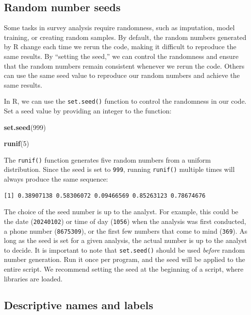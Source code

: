 \documentclass[
]{krantz}
\makeatletter
\newenvironment{Shaded}{\begin{snugshade}}{\end{snugshade}}
\newcommand{\DecValTok}[1]{\textcolor[rgb]{0.06,0.06,0.06}{#1}}
\newcommand{\FunctionTok}[1]{\textcolor[rgb]{0.27,0.27,0.27}{\textbf{#1}}}
\newcommand{\NormalTok}[1]{#1}
\newenvironment{kframe}{%
\medskip{}
\setlength{\fboxsep}{.8em}
 \def\at@end@of@kframe{}%
 \ifinner\ifhmode%
  \def\at@end@of@kframe{\end{minipage}}%
  \begin{minipage}{\columnwidth}%
 \fi\fi%
 \def\FrameCommand##1{\hskip\@totalleftmargin \hskip-\fboxsep
 \colorbox{shadecolor}{##1}\hskip-\fboxsep
     \hskip-\linewidth \hskip-\@totalleftmargin \hskip\columnwidth}%
 \MakeFramed {\advance\hsize-\width
   \@totalleftmargin\z@ \linewidth\hsize
   \@setminipage}}%
 {\par\unskip\endMakeFramed%
 \at@end@of@kframe}
\renewenvironment{Shaded}{\begin{kframe}}{\end{kframe}}
\makeatother
\begin{document}
\hypertarget{random-number-seeds}{%
\subsection{Random number seeds}\label{random-number-seeds}}

Some tasks in survey analysis require randomness, such as imputation, model training, or creating random samples. By default, the random numbers generated by R change each time we rerun the code, making it difficult to reproduce the same results. By ``setting the seed,'' we can control the randomness and ensure that the random numbers remain consistent whenever we rerun the code. Others can use the same seed value to reproduce our random numbers and achieve the same results.

In R, we can use the \texttt{set.seed()} function to control the randomness in our code. Set a seed value by providing an integer to the function:

\begin{Shaded}
\begin{Highlighting}[]
\FunctionTok{set.seed}\NormalTok{(}\DecValTok{999}\NormalTok{)}

\FunctionTok{runif}\NormalTok{(}\DecValTok{5}\NormalTok{)}
\end{Highlighting}
\end{Shaded}

The \texttt{runif()} function generates five random numbers from a uniform distribution. Since the seed is set to \texttt{999}, running \texttt{runif()} multiple times will always produce the same sequence:

\begin{verbatim}
[1] 0.38907138 0.58306072 0.09466569 0.85263123 0.78674676
\end{verbatim}

The choice of the seed number is up to the analyst. For example, this could be the date (\texttt{20240102}) or time of day (\texttt{1056}) when the analysis was first conducted, a phone number (\texttt{8675309}), or the first few numbers that come to mind (\texttt{369}). As long as the seed is set for a given analysis, the actual number is up to the analyst to decide. It is important to note that \texttt{set.seed()} should be used \emph{before} random number generation. Run it once per program, and the seed will be applied to the entire script. We recommend setting the seed at the beginning of a script, where libraries are loaded.

\hypertarget{descriptive-names-and-labels}{%
\subsection{Descriptive names and labels}\label{descriptive-names-and-labels}}
\end{document}
